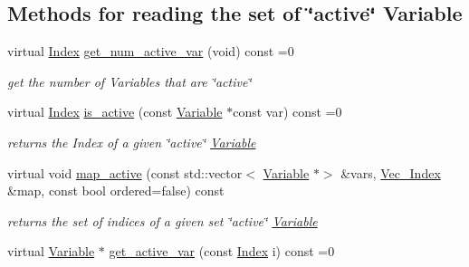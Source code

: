 \subsection*{Methods for reading the set of \char`\"{}active\char`\"{} Variable}
\begin{DoxyCompactItemize}
\item 
virtual \mbox{\hyperlink{group___thin_var_dep_interface___c_l_a_s_s_e_s_gad53d6229d7ec28555a9c9c2fd9abf773}{Index}} \mbox{\hyperlink{group___thin_var_dep_interface___c_l_a_s_s_e_s_ga6dbf09c17736b358d11f617e15856981}{get\+\_\+num\+\_\+active\+\_\+var}} (void) const =0
\begin{DoxyCompactList}\small\item\em get the number of Variables that are \char`\"{}active\char`\"{} \end{DoxyCompactList}\item 
virtual \mbox{\hyperlink{group___thin_var_dep_interface___c_l_a_s_s_e_s_gad53d6229d7ec28555a9c9c2fd9abf773}{Index}} \mbox{\hyperlink{group___thin_var_dep_interface___c_l_a_s_s_e_s_ga05297a4e506f89ec692a01aca971ce2d}{is\+\_\+active}} (const \mbox{\hyperlink{class_s_m_spp__di__unipi__it_1_1_variable}{Variable}} $\ast$const var) const =0
\begin{DoxyCompactList}\small\item\em returns the Index of a given \char`\"{}active\char`\"{} \mbox{\hyperlink{class_s_m_spp__di__unipi__it_1_1_variable}{Variable}} \end{DoxyCompactList}\item 
virtual void \mbox{\hyperlink{group___thin_var_dep_interface___c_l_a_s_s_e_s_ga88e11e9f684f5ac81df04df1cf14a423}{map\+\_\+active}} (const std\+::vector$<$ \mbox{\hyperlink{class_s_m_spp__di__unipi__it_1_1_variable}{Variable}} $\ast$$>$ \&vars, \mbox{\hyperlink{group___thin_var_dep_interface___c_l_a_s_s_e_s_ga9a1284953e2aa5222b5867c0a7f98499}{Vec\+\_\+\+Index}} \&map, const bool ordered=false) const
\begin{DoxyCompactList}\small\item\em returns the set of indices of a given set \char`\"{}active\char`\"{} \mbox{\hyperlink{class_s_m_spp__di__unipi__it_1_1_variable}{Variable}} \end{DoxyCompactList}\item 
virtual \mbox{\hyperlink{class_s_m_spp__di__unipi__it_1_1_variable}{Variable}} $\ast$ \mbox{\hyperlink{group___thin_var_dep_interface___c_l_a_s_s_e_s_ga1967518603f9424434460d4ba8676c37}{get\+\_\+active\+\_\+var}} (const \mbox{\hyperlink{group___thin_var_dep_interface___c_l_a_s_s_e_s_gad53d6229d7ec28555a9c9c2fd9abf773}{Index}} i) const =0
$$
\end{DoxyCompactItemize}

